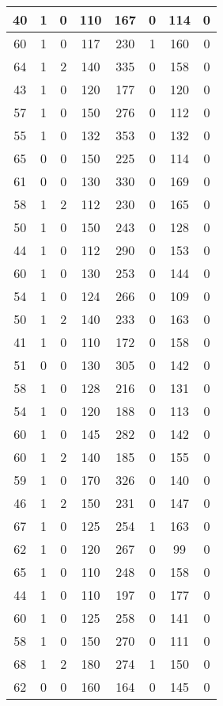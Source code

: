\documentclass{article}
\begin{document}
\begin{longtable}{|c|c|c|c|c|c|c|c|}
40 & 1 & 0 & 110 & 167 & 0 & 114 & 0 \\ \hline
60 & 1 & 0 & 117 & 230 & 1 & 160 & 0 \\ \hline
64 & 1 & 2 & 140 & 335 & 0 & 158 & 0 \\ \hline
43 & 1 & 0 & 120 & 177 & 0 & 120 & 0 \\ \hline
57 & 1 & 0 & 150 & 276 & 0 & 112 & 0 \\ \hline
55 & 1 & 0 & 132 & 353 & 0 & 132 & 0 \\ \hline
65 & 0 & 0 & 150 & 225 & 0 & 114 & 0 \\ \hline
61 & 0 & 0 & 130 & 330 & 0 & 169 & 0 \\ \hline
58 & 1 & 2 & 112 & 230 & 0 & 165 & 0 \\ \hline
50 & 1 & 0 & 150 & 243 & 0 & 128 & 0 \\ \hline
44 & 1 & 0 & 112 & 290 & 0 & 153 & 0 \\ \hline
60 & 1 & 0 & 130 & 253 & 0 & 144 & 0 \\ \hline
54 & 1 & 0 & 124 & 266 & 0 & 109 & 0 \\ \hline
50 & 1 & 2 & 140 & 233 & 0 & 163 & 0 \\ \hline
41 & 1 & 0 & 110 & 172 & 0 & 158 & 0 \\ \hline
51 & 0 & 0 & 130 & 305 & 0 & 142 & 0 \\ \hline
58 & 1 & 0 & 128 & 216 & 0 & 131 & 0 \\ \hline
54 & 1 & 0 & 120 & 188 & 0 & 113 & 0 \\ \hline
60 & 1 & 0 & 145 & 282 & 0 & 142 & 0 \\ \hline
60 & 1 & 2 & 140 & 185 & 0 & 155 & 0 \\ \hline
59 & 1 & 0 & 170 & 326 & 0 & 140 & 0 \\ \hline
46 & 1 & 2 & 150 & 231 & 0 & 147 & 0 \\ \hline
67 & 1 & 0 & 125 & 254 & 1 & 163 & 0 \\ \hline
62 & 1 & 0 & 120 & 267 & 0 & 99 & 0 \\ \hline
65 & 1 & 0 & 110 & 248 & 0 & 158 & 0 \\ \hline
44 & 1 & 0 & 110 & 197 & 0 & 177 & 0 \\ \hline
60 & 1 & 0 & 125 & 258 & 0 & 141 & 0 \\ \hline
58 & 1 & 0 & 150 & 270 & 0 & 111 & 0 \\ \hline
68 & 1 & 2 & 180 & 274 & 1 & 150 & 0 \\ \hline
62 & 0 & 0 & 160 & 164 & 0 & 145 & 0 \\ \hline

\end{longtable}
\end{document}
